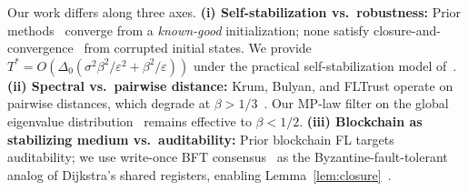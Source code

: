 Our work differs along three axes.
\textbf{(i) Self-stabilization vs.\ robustness:}
Prior methods~\cite{krum,bulyan,crfl,flame,byzshield,karimireddy_bucketing} converge from
a \emph{known-good} initialization; none satisfy closure-and-convergence~\cite{arora_gouda}
from corrupted initial states.
We provide $T^* = O(\Delta_0(\sigma^2\beta^2/\varepsilon^2 + \beta^2/\varepsilon))$
under the practical self-stabilization model of~\cite{dolev_kat_practical}.
\textbf{(ii) Spectral vs.\ pairwise distance:}
Krum, Bulyan, and FLTrust operate on pairwise distances, which degrade at $\beta > 1/3$~\cite{farhadkhani_byzsgd}.
Our MP-law filter on the global eigenvalue distribution~\cite{bbp_transition} remains
effective to $\beta < 1/2$.
\textbf{(iii) Blockchain as stabilizing medium vs.\ auditability:}
Prior blockchain FL targets auditability; we use write-once BFT consensus~\cite{garay_backbone}
as the Byzantine-fault-tolerant analog of Dijkstra's shared registers,
enabling Lemma~\ref{lem:closure}~\cite{awerbuch_varghese,sss_blockchain_sharding}.
